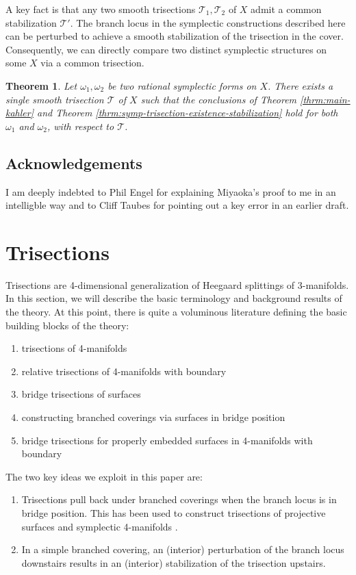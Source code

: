 \documentclass[11pt]{amsart}
\newtheorem{theorem}{Theorem}[section]
\theoremstyle{definition}
\theoremstyle{remark}
\numberwithin{equation}{section}
\newcommand{\cT}{\mathcal{T}}
\begin{document}
A key fact is that any two smooth trisections $\cT_1,\cT_2$ of $X$ admit a common stabilization $\cT'$. The branch locus in the symplectic constructions described here can be perturbed to achieve a smooth stabilization of the trisection in the cover.  Consequently, we can directly compare two distinct symplectic structures on some $X$ via a common trisection.

\begin{theorem}
    Let $\omega_1,\omega_2$ be two rational symplectic forms on $X$.  There exists a single smooth trisection $\cT$ of $X$ such that the conclusions of Theorem \ref{thrm:main-kahler} and Theorem \ref{thrm:symp-trisection-existence-stabilization} hold for both $\omega_1$ and $\omega_2$, with respect to $\cT$.
\end{theorem}

\subsection{Acknowledgements}

I am deeply indebted to Phil Engel for explaining Miyaoka's proof to me in an intelligble way and to Cliff Taubes for pointing out a key error in an earlier draft.

\section{Trisections}
\label{sec:trisections}

Trisections are 4-dimensional generalization of Heegaard splittings of 3-manifolds.  In this section, we will describe the basic terminology and background results of the theory.  At this point, there is quite a voluminous literature defining the basic building blocks of the theory:
\begin{enumerate}
    \item trisections of 4-manifolds \cite{Gay-Kirby}
    \item relative trisections of 4-manifolds with boundary \cite{Relative-Tri}
    \item bridge trisections of surfaces \cite{MZ1,MZ2}
    \item constructing branched coverings via surfaces in bridge position \cite{LM-Rational,LMS}
    \item bridge trisections for properly embedded surfaces in 4-manifolds with boundary \cite{Meier-Relative-Bridge}
\end{enumerate}

The two key ideas we exploit in this paper are:
\begin{enumerate}
    \item Trisections pull back under branched coverings when the branch locus is in bridge position.  This has been used to construct trisections of projective surfaces \cite{LM-Rational} and symplectic 4-manifolds \cite{LMS}.
    \item In a simple branched covering, an (interior) perturbation of the branch locus downstairs results in an (interior) stabilization of the trisection upstairs.
\end{enumerate}
\end{document}
